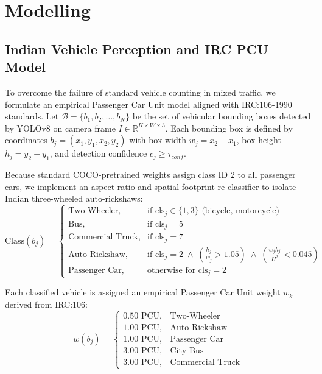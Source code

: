 \documentclass[12pt,a4paper,oneside]{report}
\begin{document}
\section{Modelling}
\label{sec:modelling}

\subsection{Indian Vehicle Perception and IRC PCU Model}
\label{subsec:pcu_model}
To overcome the failure of standard vehicle counting in mixed traffic, we formulate an empirical Passenger Car Unit model aligned with IRC:106-1990 standards. Let $\mathcal{B} = \{b_1, b_2, \dots, b_N\}$ be the set of vehicular bounding boxes detected by YOLOv8 on camera frame $I \in \mathbb{R}^{H \times W \times 3}$. Each bounding box is defined by coordinates $b_j = (x_1, y_1, x_2, y_2)$ with box width $w_j = x_2 - x_1$, box height $h_j = y_2 - y_1$, and detection confidence $c_j \ge \tau_{conf}$.

Because standard COCO-pretrained weights assign class ID 2 to all passenger cars, we implement an aspect-ratio and spatial footprint re-classifier to isolate Indian three-wheeled auto-rickshaws:
\begin{equation}
\text{Class}(b_j) = 
\begin{cases}
\text{Two-Wheeler}, & \text{if } \text{cls}_j \in \{1, 3\} \text{ (bicycle, motorcycle)} \\
\text{Bus}, & \text{if } \text{cls}_j = 5 \\
\text{Commercial Truck}, & \text{if } \text{cls}_j = 7 \\
\text{Auto-Rickshaw}, & \text{if } \text{cls}_j = 2 \;\land\; \left(\frac{h_j}{w_j} > 1.05\right) \;\land\; \left(\frac{w_j h_j}{H^2} < 0.045\right) \\
\text{Passenger Car}, & \text{otherwise for } \text{cls}_j = 2
\end{cases}
\end{equation}

Each classified vehicle is assigned an empirical Passenger Car Unit weight $w_k$ derived from IRC:106:
\begin{equation}
w(b_j) = 
\begin{cases}
0.50 \text{ PCU}, & \text{Two-Wheeler} \\
1.00 \text{ PCU}, & \text{Auto-Rickshaw} \\
1.00 \text{ PCU}, & \text{Passenger Car} \\
3.00 \text{ PCU}, & \text{City Bus} \\
3.00 \text{ PCU}, & \text{Commercial Truck}
\end{cases}
\end{equation}
\end{document}
